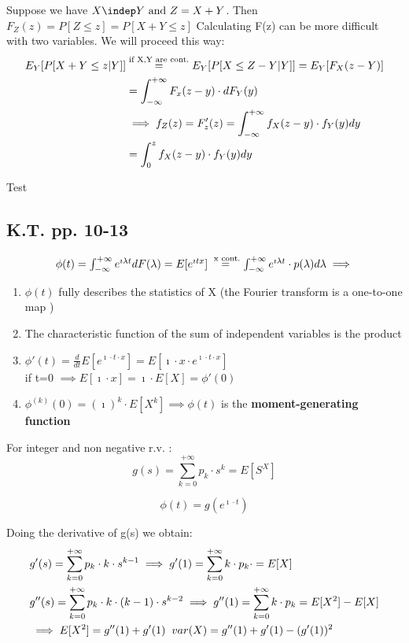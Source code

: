 Suppose we have $X \indep Y \text{ and } Z=X+Y$. Then $F_Z(z) = P[Z\le z] = P[X+Y \le z]$
Calculating F(z) can be more difficult with two variables. We will proceed this way:
\\
\begin{equation}
  $$
  \begin{split}
    E_{Y}[P[X+Y \le z | Y]]  &\stackrel{\text{if X,Y are cont.}}{=} E_Y [P[X \le Z - Y | Y]] = E_Y[F_X(z-Y)]\\
    &=\int_{-\infty}^{+\infty}F_x(z-y) \cdot dF_Y(y) \\
    &\implies f_Z(z) = F'_z(z) = \int_{-\infty}^{+\infty}{f_X(z-y)\cdot f_Y(y) dy} \\
    &=\int_{0}^{z}{f_X(z-y) \cdot f_Y(y) dy}
  \end{split}
  $$
\end{equation}

Test
\subsection{K.T. pp. 10-13}
\begin{equation}
  $$\phi(t) = \int_{-\infty}^{+\infty}e^{\imath \lambda t} dF(\lambda) = E[e^{\imath t x}]\stackrel{\text{ x cont.}}{=}
  \int_{-\infty}^{+\infty}e^{\imath \lambda t} \cdot p(\lambda) d\lambda
  \\ \implies$$
\end{equation}
\begin{enumerate}
  \item $\phi(t)$ fully describes the statistics of X (the Fourier transform is a  one-to-one map )
  \item The characteristic function of the sum of independent variables is the product
  \item $\phi'(t)=\frac{d}{dt} E[e^{\imath \cdot t \cdot x}]=E[\imath \cdot x \cdot e^{\imath \cdot t \cdot x}]$ \\
  if t=0 $\implies E[\imath \cdot x]=\imath \cdot E[ X] = \phi'(0)$
  \item $\phi^{(k)}(0) = (\imath)^k \cdot E[X^k] \implies \phi(t)$ is the \textbf{moment-generating function}
\end{enumerate}


For integer and non negative r.v. :
$$g(s)=\sum\limits_{k=0}^{+\infty}p_k \cdot s^k = E[S^X]$$

$$\phi(t) = g(e^{\imath \cdot t})$$

Doing the derivative of g(s) we obtain:
\begin{equation}
   $$
  \begin{split}
    & g'(s) = \sum\limits_{k=0}^{+\infty} p_k \cdot k \cdot s^{k-1}
    \implies g'(1) = \sum\limits_{k=0}^{+\infty} k \cdot p_k \cdot = E[X] \\
    & g''(s) = \sum\limits_{k=0}^{+\infty} p_k \cdot k \cdot (k-1) \cdot s^{k-2}
    \implies g''(1) = \sum\limits_{k=0}^{+\infty} k \cdot p_k = E[X^2]-E[X] \\
    &\implies E[X^2] = g''(1)+g'(1) \; \; var(X) = g''(1)+g'(1)-(g'(1))^2
  \end{split}
  $$
\end{equation}

